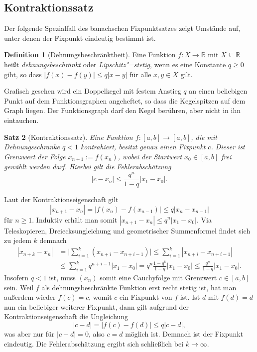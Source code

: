 \documentclass[
  a4paper, 11pt, fleqn, twoside,
  abstract=true
]{scrartcl}
\makeatletter
\renewenvironment{proof}[1][\proofname]{\par
  \normalfont\topsep2\p@\@plus2\p@\relax
  \trivlist
  \item[\hskip\labelsep\bfseries #1\@addpunct{.}]\ignorespaces
}{\endtrivlist\@endpefalse}
\theoremstyle{plain}
\newtheorem{theorem}{Satz}[section]
\theoremstyle{definition}
\newtheorem{definition}[theorem]{Definition}
\newcommand{\R}{\mathbb R}
\makeatother
\begin{document}
\subsection{Kontraktionssatz}

Der folgende Spezialfall des banachschen Fixpunktsatzes zeigt Umstände
auf, unter denen der Fixpunkt eindeutig bestimmt ist.

\begin{definition}[Dehnungsbeschränktheit]
Eine Funktion $f\colon X\to\R$ mit $X\subseteq\R$ heißt
\emph{dehnungsbeschränkt} oder \emph{Lipschitz"=stetig}, wenn es eine
Konstante $q\ge 0$ gibt, so dass $|f(x)-f(y)| \le q|x-y|$ für alle
$x,y\in X$ gilt.
\end{definition}

\noindent
Grafisch gesehen wird ein Doppelkegel mit festem Anstieg $q$ an einen
beliebigen Punkt auf dem Funktionsgraphen angeheftet, so dass die
Kegelspitzen auf dem Graph liegen. Der Funktionsgraph darf den Kegel
berühren, aber nicht in ihn eintauchen.

\begin{theorem}[Kontraktionssatz]
Eine Funktion $f\colon [a,b]\to [a,b]$, die mit Dehnungsschranke $q<1$
kontrahiert, besitzt genau einen Fixpunkt $c$. Dieser ist Grenzwert
der Folge $x_{n+1} := f(x_n)$, wobei der Startwert $x_0\in [a,b]$ frei
gewählt werden darf. Hierbei gilt die Fehlerabschätzung
\[|c-x_n| \le \frac{q^n}{1-q}|x_1-x_0|.\]
\end{theorem}

\begin{proof}
Laut der Kontraktionseigenschaft gilt
\[|x_{n+1}-x_n| = |f(x_n)-f(x_{n-1})| \le q|x_n-x_{n-1}|\]
für $n\ge 1$. Induktiv erhält man somit $|x_{n+1}-x_n|\le q^n|x_1-x_0|$.
Via Teleskopieren, Dreiecksungleichung und geometrischer Summenformel
findet sich zu jedem $k$ demnach
\begin{align*}
|x_{n+k}-x_n| &= \bigg|\sum_{i=1}^k (x_{n+i}-x_{n+i-1})\bigg|
\le \sum_{i=1}^k |x_{n+i}-x_{n+i-1}|\\
&\le \sum_{i=1}^k q^{n+i-1}|x_1-x_0|
= q^n\frac{1-q^k}{1-q}|x_1-x_0|\le \frac{q^n}{1-q}|x_1-x_0|.
\end{align*}
Insofern $q<1$ ist, muss $(x_n)$ somit eine Cauchyfolge mit Grenzwert
$c\in [a,b]$ sein. Weil $f$ als dehnungsbeschränkte Funktion erst
recht stetig ist, hat man außerdem wieder $f(c)=c$, womit $c$ ein
Fixpunkt von $f$ ist. Ist $d$ mit $f(d)=d$ nun ein beliebiger weiterer
Fixpunkt, dann gilt aufgrund der Kontraktionseigenschaft die Ungleichung
\[|c-d| = |f(c)-f(d)|\le q|c-d|,\]
was aber nur für $|c-d|=0$, also $c=d$ möglich ist. Demnach ist der
Fixpunkt eindeutig. Die Fehlerabschätzung ergibt sich schließlich bei
$k\to\infty$.\,\qedsymbol
\end{proof}
\end{document}
